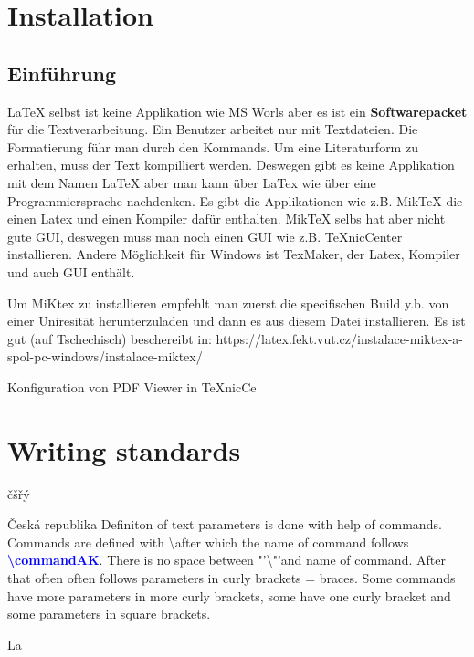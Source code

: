 \chapter{Installation}
\section{Einführung}
LaTeX selbst ist keine Applikation wie MS Worls aber es ist ein \textbf{Softwarepacket} für die Textverarbeitung. Ein Benutzer arbeitet nur mit Textdateien. Die Formatierung führ man durch den Kommands. Um eine Literaturform zu erhalten, muss der Text kompilliert werden. Deswegen gibt es keine Applikation mit dem Namen LaTeX aber man kann über LaTex wie über eine Programmiersprache nachdenken. Es gibt die Applikationen wie z.B. MikTeX die einen Latex und einen Kompiler dafür enthalten. MikTeX selbs hat aber nicht gute GUI, deswegen muss man noch einen GUI wie z.B. TeXnicCenter installieren. Andere Möglichkeit für Windows ist TexMaker, der Latex, Kompiler und auch GUI enthält. 

Um MiKtex zu installieren empfehlt man zuerst die specifischen Build y.b. von einer Uniresität herunterzuladen und dann es aus diesem Datei installieren. Es ist gut (auf Tschechisch) beschereibt in:
https://latex.fekt.vut.cz/instalace-miktex-a-spol-pc-windows/instalace-miktex/

Konfiguration von PDF Viewer in TeXnicCe
\chapter{Writing standards}
čšřý

Česká republika
Definiton of text parameters is done with help of commands. Commands are defined with \textbackslash after which the name of command follows \textcolor {blue}{\bf\textbackslash commandAK\bf}. There is no space between "'\textbackslash"'and name of command. After that often often follows parameters in curly brackets = braces. Some commands have more parameters in more curly brackets, some have one curly bracket and some parameters in square brackets. 

La